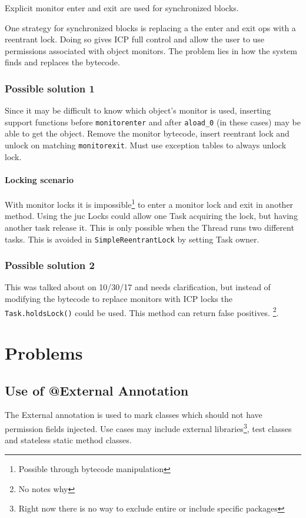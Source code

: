 \documentclass[9pt, twoside, a4paper]{article}
\begin{document}
    Explicit monitor enter and exit are used for synchronized blocks.

    One strategy for synchronized blocks is replacing a the enter and exit ops with a reentrant lock. Doing so gives
    ICP full control and allow the \gls{user} to use permissions associated with object monitors. The problem lies in how
    the system finds and replaces the bytecode.

    \subsubsection*{Possible solution 1}
    Since it may be difficult to know which object's monitor is used, inserting support functions before
    \lstinline{monitorenter} and after \lstinline{aload_0} (in these cases) may be able to get the object.
    Remove the monitor bytecode, insert reentrant lock and unlock on matching \lstinline{monitorexit}. Must use
    exception tables to always unlock lock.

    \paragraph*{Locking scenario}
    With monitor locks it is impossible\footnote{Possible through bytecode manipulation} to enter a monitor lock
    and exit in another method. Using the \gls{juc} Locks could allow one Task acquiring the lock, but having
    another task release it. This is only possible when the Thread runs two different tasks. This is avoided
    in \lstinline{SimpleReentrantLock} by setting Task owner.

    \subsubsection*{Possible solution 2}
    This was talked about on 10/30/17 and needs clarification, but instead of modifying the bytecode to replace
    monitors with ICP locks the \lstinline{Task.holdsLock()} could be used. This method can return false positives.
    \footnote{No notes why}.

    \section{Problems}

    \subsection{Use of @External Annotation}
    The External annotation is used to mark classes which should not have permission fields injected. Use cases may
    include external libraries\footnote{Right now there is no way to exclude entire or include specific packages},
    test classes and stateless static method classes.
\end{document}
